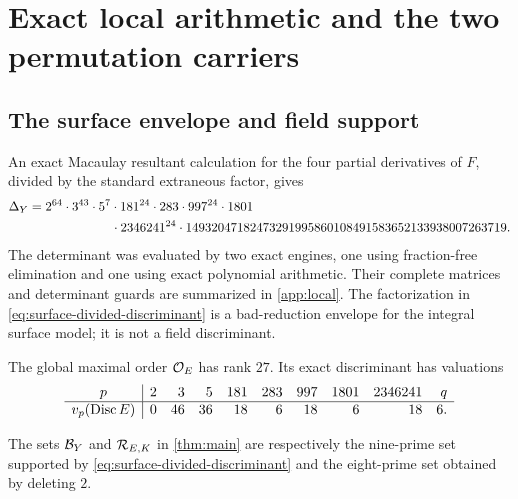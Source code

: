 \section{Exact local arithmetic and the two permutation carriers}
\label{sec:local-arithmetic}

\subsection{The surface envelope and field support}

An exact Macaulay resultant calculation for the four partial derivatives of
$F$, divided by the standard extraneous factor, gives
\begin{equation}
\begin{split}
\Delta_Y={}&2^{64}\cdot3^{43}\cdot5^7\cdot181^{24}\cdot283
\cdot997^{24}\cdot1801\\
&\hspace{18mm}\cdot2346241^{24}\cdot
14932047182473291995860108491583652133938007263719.
\end{split}
\label{eq:surface-divided-discriminant}
\end{equation}
The determinant was evaluated by two exact engines, one using fraction-free
elimination and one using exact polynomial arithmetic.  Their complete
matrices and determinant guards are summarized in \cref{app:local}.  The
factorization in \cref{eq:surface-divided-discriminant} is a bad-reduction
envelope for the integral surface model; it is not a field discriminant.

The global maximal order $\mathcal{O}_E$ has rank $27$.  Its exact discriminant has
valuations
\begin{equation}
\begin{array}{c|rrrrrrrrr}
p&2&3&5&181&283&997&1801&2346241&q\\ \hline
v_p(\operatorname{Disc} E)&0&46&36&18&6&18&6&18&6.
\end{array}
\label{eq:discE-valuation-vector}
\end{equation}

\begin{proposition}
\label{prop:support}
The sets $\mathcal{B}_Y$ and $\mathcal{R}_{E,K}$ in \cref{thm:main} are respectively the
nine-prime set supported by \cref{eq:surface-divided-discriminant} and the
eight-prime set obtained by deleting $2$.
\end{proposition}

